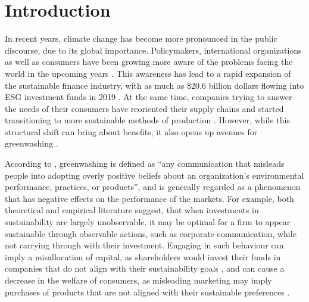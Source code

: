 \documentclass[12pt]{article}
\author{Your Name}
\date{Date of submission: \today}
\begin{document}

\pagebreak
{}




\tableofcontents
\pagebreak
\listoffigures
\listoftables
\pagebreak

\setcounter{page}{1}

\section{Introduction}\label{sect:introduction}

In recent years, climate change has become more pronounced in the public discourse, due to its global importance. Policymakers, international organizations as well as consumers have been growing more aware of the problems facing the world in the upcoming years \parencite{pew2022climate}. This awareness has lead to a rapid expansion of the sustainable finance industry, with as much as \$20.6 billion dollars flowing into ESG investment funds in 2019 \parencite{hale2020sustainable}. At the same time, companies trying to answer the needs of their consumers have reoriented their supply chains and started transitioning to more sustainable methods of production \parencite{pwc2023supplychain, pwc2023sustainability}. However, while this structural shift can bring about benefits, it also opens up avenues for greenwashing \parencite{villenaMoreSustainableSupply2020}.

According to \textcite{lyonMeansEndGreenwash2015}, greenwashing is defined as ``any communication that misleads people into adopting overly positive beliefs about an organization's  environmental performance, practices, or products'', and is generally regarded as a phenomenon that has negative effects on the performance of the markets. For example, both theoretical \parencite{wuBadGreenwashingGood2020, cartellierCanInvestorsCurb2023} and empirical \parencite{barrageAdvertisingEnvironmentalStewardship2020, marquisScrutinyNormsSelective2016, kimGreenwashVsBrownwash2015} literature suggest, that when investments in sustainability are largely unobservable, it may be optimal for a firm to appear sustainable through observable actions, such as corporate communication, while not carrying through with their investment. Engaging in such behaviour can imply a misallocation of capital, as shareholders would invest their funds in companies that do not align with their sustainability goals \parencite{kimGreenwashVsBrownwash2015}, and can cause a decrease in the welfare of consumers, as misleading marketing may imply purchases of products that are not aligned with their sustainable preferences \parencite{barrageAdvertisingEnvironmentalStewardship2020}.
\end{document}
